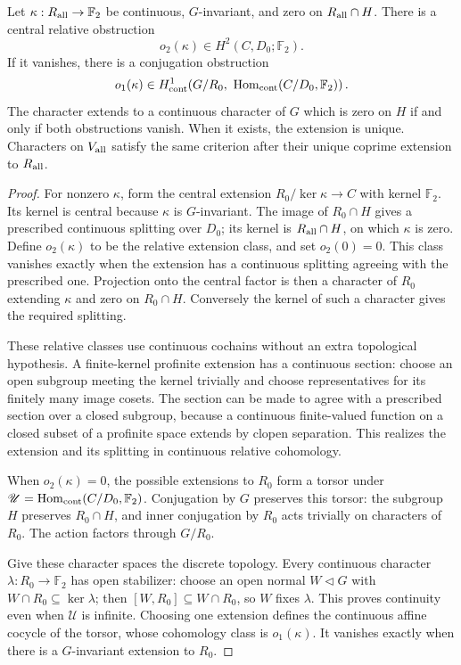 \begin{proposition}
\label{prop:all-cm-intrinsic-extension}
Let \(\kappa:R_{\rm all}\to\mathbb F_2\) be continuous,
\(G\)-invariant, and zero on \(R_{\rm all}\cap H\).
There is a central relative obstruction
\[
 o_2(\kappa)\in H^2(C,D_0;\mathbb F_2).
\]
If it vanishes, there is a conjugation obstruction
\[
 o_1(\kappa)\in
 H^1_{\rm cont}\!\left(G/R_0,\
    \operatorname{Hom}_{\rm cont}(C/D_0,\mathbb F_2)\right).
\]
The character extends to a continuous character of
\(G\) which is zero on \(H\) if and only if both
obstructions vanish. When it exists, the extension
is unique. Characters on \(V_{\rm all}\) satisfy
the same criterion after their unique coprime
extension to \(R_{\rm all}\).
\end{proposition}
\begin{proof}
For nonzero \(\kappa\), form the central extension
\(R_0/\ker\kappa\to C\) with kernel \(\mathbb F_2\).
Its kernel is central because \(\kappa\) is
\(G\)-invariant. The image of \(R_0\cap H\) gives
a prescribed continuous splitting over \(D_0\);
its kernel is \(R_{\rm all}\cap H\), on which
\(\kappa\) is zero. Define \(o_2(\kappa)\) to be
the relative extension class, and set \(o_2(0)=0\).
This class vanishes exactly when the extension has
a continuous splitting agreeing with the prescribed
one. Projection onto the central factor is then
a character of \(R_0\) extending \(\kappa\) and
zero on \(R_0\cap H\). Conversely the kernel of
such a character gives the required splitting.

These relative classes use continuous cochains
without an extra topological hypothesis.
A finite-kernel profinite extension has a continuous
section: choose an open subgroup meeting the kernel
trivially and choose representatives for its finitely
many image cosets. The section can be made to agree
with a prescribed section over a closed subgroup,
because a continuous finite-valued function on a
closed subset of a profinite space extends by
clopen separation. This realizes the extension
and its splitting in continuous relative cohomology.

When \(o_2(\kappa)=0\), the possible extensions to
\(R_0\) form a torsor under
\(\mathscr U=\operatorname{Hom}_{\rm cont}(C/D_0,\mathbb F_2)\).
Conjugation by \(G\) preserves this torsor: the subgroup
\(H\) preserves \(R_0\cap H\), and inner conjugation
by \(R_0\) acts trivially on characters of \(R_0\).
The action factors through \(G/R_0\).

Give these character spaces the discrete topology.
Every continuous character \(\lambda:R_0\to\mathbb F_2\)
has open stabilizer: choose an open normal
\(W\triangleleft G\) with
\(W\cap R_0\subseteq\ker\lambda\); then
\([W,R_0]\subseteq W\cap R_0\), so \(W\) fixes
\(\lambda\). This proves continuity even when
\(\mathscr U\) is infinite.
Choosing one extension defines the continuous
affine cocycle of the torsor, whose cohomology
class is \(o_1(\kappa)\). It vanishes exactly when
there is a \(G\)-invariant extension to \(R_0\).


\end{proof}
